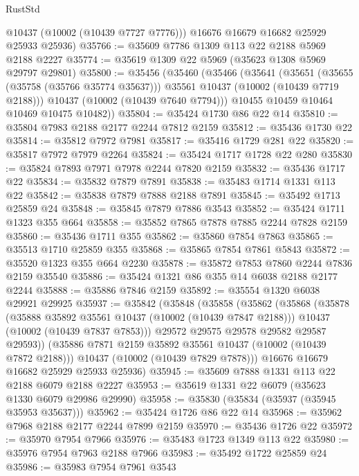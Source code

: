 \begin{lexlean}{RustStd}
\begin{coremodule}
        @10437
        (@10002 (@10439 @7727 @7776)))
      @16676
      @16679
      @16682
      @25929
      @25933
      @25936)
@35766 := @35609 @7786 @1309 @113 @22 @2188 @5969 @2188 @2227
@35774 := @35619 @1309 @22 @5969 (@35623 @1308 @5969 @29797 @29801)
@35800 := @35456
    (@35460
      (@35466
        (@35641
          (@35651
            (@35655 (@35758 (@35766 @35774 @35637)))
            @35561
            @10437
            (@10002 (@10439 @7719 @2188)))
          @10437
          (@10002 (@10439 @7640 @7794)))
        @10455
        @10459
        @10464
        @10469
        @10475
        @10482))
@35804 := @35424 @1730 @86 @22 @14
@35810 := @35804 @7983 @2188 @2177 @2244 @7812 @2159
@35812 := @35436 @1730 @22
@35814 := @35812 @7972 @7981
@35817 := @35416 @1729 @281 @22
@35820 := @35817 @7972 @7979 @2264
@35824 := @35424 @1717 @1728 @22 @280
@35830 := @35824 @7893 @7971 @7978 @2244 @7820 @2159
@35832 := @35436 @1717 @22
@35834 := @35832 @7879 @7891
@35838 := @35483 @1714 @1331 @113 @22
@35842 := @35838 @7879 @7888 @2188 @7891
@35845 := @35492 @1713 @25859 @24
@35848 := @35845 @7879 @7886 @3543
@35852 := @35424 @1711 @1323 @355 @664
@35858 := @35852 @7865 @7878 @7885 @2244 @7828 @2159
@35860 := @35436 @1711 @355
@35862 := @35860 @7854 @7863
@35865 := @35513 @1710 @25859 @355
@35868 := @35865 @7854 @7861 @5843
@35872 := @35520 @1323 @355 @664 @2230
@35878 := @35872 @7853 @7860 @2244 @7836 @2159 @35540
@35886 := @35424 @1321 @86 @355 @14 @6038 @2188 @2177 @2244
@35888 := @35886 @7846 @2159
@35892 := @35554 @1320 @6038 @29921 @29925
@35937 := @35842
    (@35848
      (@35858
        (@35862
          (@35868
            (@35878
              (@35888 @35892 @35561 @10437 (@10002 (@10439 @7847 @2188)))
              @10437
              (@10002 (@10439 @7837 @7853)))
            @29572
            @29575
            @29578
            @29582
            @29587
            @29593))
        (@35886 @7871 @2159 @35892 @35561 @10437 (@10002 (@10439 @7872 @2188)))
        @10437
        (@10002 (@10439 @7829 @7878)))
      @16676
      @16679
      @16682
      @25929
      @25933
      @25936)
@35945 := @35609 @7888 @1331 @113 @22 @2188 @6079 @2188 @2227
@35953 := @35619 @1331 @22 @6079 (@35623 @1330 @6079 @29986 @29990)
@35958 := @35830 (@35834 (@35937 (@35945 @35953 @35637)))
@35962 := @35424 @1726 @86 @22 @14
@35968 := @35962 @7968 @2188 @2177 @2244 @7899 @2159
@35970 := @35436 @1726 @22
@35972 := @35970 @7954 @7966
@35976 := @35483 @1723 @1349 @113 @22
@35980 := @35976 @7954 @7963 @2188 @7966
@35983 := @35492 @1722 @25859 @24
@35986 := @35983 @7954 @7961 @3543

\end{coremodule}
\end{lexlean}
